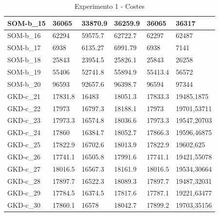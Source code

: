 \documentclass[11pt,a4paper]{article}
\begin{document}
\begin{table}[H]
\begin{tabular}{l|l|l|l|l|l|}
			\multicolumn{1}{|l|}{SOM-b\_15} & 36065            & 33870.9        & 36259.9         & 36065       & 36317       \\ \hline
			\multicolumn{1}{|l|}{SOM-b\_16} & 62294            & 59575.7        & 62722.7         & 62297       & 62487       \\ \hline
			\multicolumn{1}{|l|}{SOM-b\_17} & 6938             & 6135.27        & 6991.79         & 6938        & 7141        \\ \hline
			\multicolumn{1}{|l|}{SOM-b\_18} & 25843            & 23954.5        & 25826.1         & 25843       & 26258       \\ \hline
			\multicolumn{1}{|l|}{SOM-b\_19} & 55406            & 52741.8        & 55894.9         & 55413.4     & 56572       \\ \hline
			\multicolumn{1}{|l|}{SOM-b\_20} & 96593            & 92657.6        & 96398.7         & 96594       & 97344       \\ \hline
			\multicolumn{1}{|l|}{GKD-c\_21} & 17831.8          & 16483          & 18051.3         & 17833.3     & 19485,1875  \\ \hline
			\multicolumn{1}{|l|}{GKD-c\_22} & 17973            & 16797.3        & 18188.1         & 17973       & 19701,53711 \\ \hline
			\multicolumn{1}{|l|}{GKD-c\_23} & 17973.3          & 16574.8        & 18036.6         & 17973.3     & 19547,20703 \\ \hline
			\multicolumn{1}{|l|}{GKD-c\_24} & 17860            & 16384.7        & 18052.7         & 17866.3     & 19596,46875 \\ \hline
			\multicolumn{1}{|l|}{GKD-c\_25} & 17822.9          & 16702.6        & 18013.9         & 17822.9     & 19602,625   \\ \hline
			\multicolumn{1}{|l|}{GKD-c\_26} & 17741.1          & 16505.8        & 17991.6         & 17741.1     & 19421,55078 \\ \hline
			\multicolumn{1}{|l|}{GKD-c\_27} & 18016.5          & 16567.3        & 18161.9         & 18016.5     & 19534,30664 \\ \hline
			\multicolumn{1}{|l|}{GKD-c\_28} & 17897.7          & 16522.3        & 18089.3         & 17897.7     & 19487,32031 \\ \hline
			\multicolumn{1}{|l|}{GKD-c\_29} & 17784.5          & 16374.5        & 17817.6         & 17787.1     & 19221,63477 \\ \hline
			\multicolumn{1}{|l|}{GKD-c\_30} & 17860.1          & 16578          & 18042.7         & 17899.2     & 19703,35156 \\ \hline
		\end{tabular}
		\caption{ Experimento 1 - Costes }
		\label{costes}
	\end{table}
\end{document}
